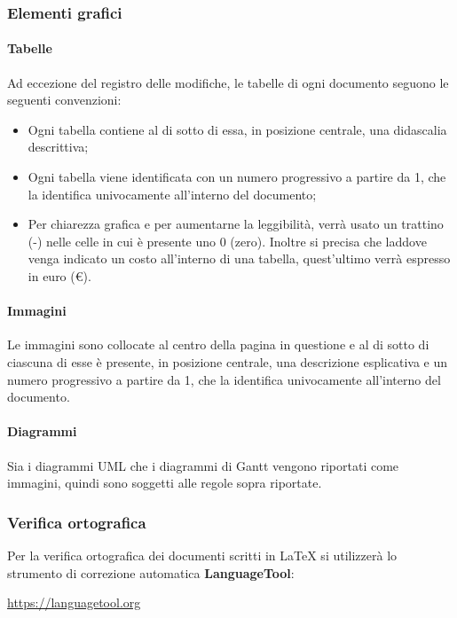 \subsubsection{Elementi grafici}
\paragraph{Tabelle}
Ad eccezione del registro delle modifiche, le tabelle di ogni documento seguono le seguenti convenzioni:
\begin{itemize}
    \item Ogni tabella contiene al di sotto di essa, in posizione centrale, una didascalia descrittiva;
    \item Ogni tabella viene identificata con un numero progressivo a partire da 1, che la identifica univocamente all'interno del documento;
    \item Per chiarezza grafica e per aumentarne la leggibilità, verrà usato un trattino (-) nelle celle in cui è presente uno 0 (zero). Inoltre si precisa che laddove venga indicato un costo all'interno di una tabella, quest'ultimo verrà espresso in euro (€).
\end{itemize}
\paragraph{Immagini}
Le immagini sono collocate al centro della pagina in questione e al di sotto di ciascuna di esse è presente, in posizione centrale, una descrizione esplicativa e un numero progressivo a partire da 1, che la identifica univocamente all'interno del documento.
\paragraph{Diagrammi}
Sia i diagrammi UML\glo{} che i diagrammi di Gantt\glo{} vengono riportati come immagini, quindi sono soggetti alle regole sopra riportate.
\subsubsection{Verifica ortografica} \label{verifica_ortografica}
Per la verifica ortografica dei documenti scritti in \LaTeX{} si utilizzerà lo strumento di correzione automatica \textbf{LanguageTool}:
\begin{center}\url{https://languagetool.org}\end{center}


